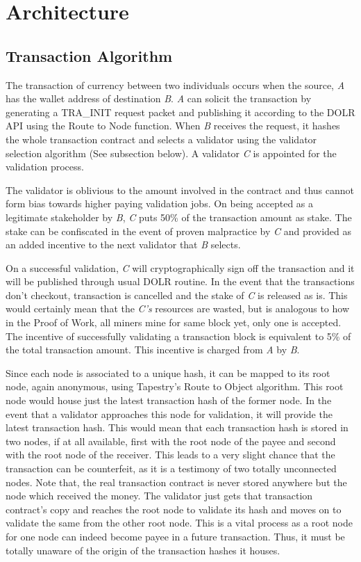 \documentclass[conference,a4paper,12pt]{IEEEtran}
\begin{document}
\section{Architecture}
	\subsection{Transaction Algorithm}

	The transaction of currency between two individuals occurs when the source, \textit{A} has the wallet address of destination \textit{B}. \textit{A} can solicit the transaction by generating a TRA\_INIT request packet and publishing it according to the DOLR API \cite{tapestry_dolr} using the Route to Node function. When \textit{B} receives the request, it hashes the whole transaction contract and selects a validator using the validator selection algorithm (See subsection below). A validator \textit{C} is appointed for the validation process.

	The validator is oblivious to the amount involved in the contract and thus cannot form bias towards higher paying validation jobs. On being accepted as a legitimate stakeholder by \textit{B}, \textit{C} puts 50\% of the transaction amount as stake. The stake can be confiscated in the event of proven malpractice by \textit{C} and provided as an added incentive to the next validator that \textit{B} selects.

	On a successful validation, \textit{C} will cryptographically sign off the transaction and it will be published through usual DOLR \cite{tapestry_dolr} routine. In the event that the transactions don't checkout, transaction is cancelled and the stake of \textit{C} is released as is. This would certainly mean that the \textit{C's} resources are wasted, but is analogous to how in the Proof of Work, all miners mine for same block yet, only one is accepted. The incentive of successfully validating a transaction block is equivalent to 5\% of the total transaction amount. This incentive is charged from \textit{A} by \textit{B}.

	Since each node is associated to a unique hash, it can be mapped to its root node, again anonymous, using Tapestry's Route to Object algorithm. This root node would house just the latest transaction hash of the former node. In the event that a validator approaches this node for validation, it will provide the latest transaction hash. This would mean that each transaction hash is stored in two nodes, if at all available, first with the root node of the payee and second with the root node of the receiver. This leads to a very slight chance that the transaction can be counterfeit, as it is a testimony of two totally unconnected nodes. Note that, the real transaction contract is never stored anywhere but the node which received the money. The validator just gets that transaction contract's copy and reaches the root node to validate its hash and moves on to validate the same from the other root node. This is a vital process as a root node for one node can indeed become payee in a future transaction. Thus, it must be totally unaware of the origin of the transaction hashes it houses.
\end{document}

